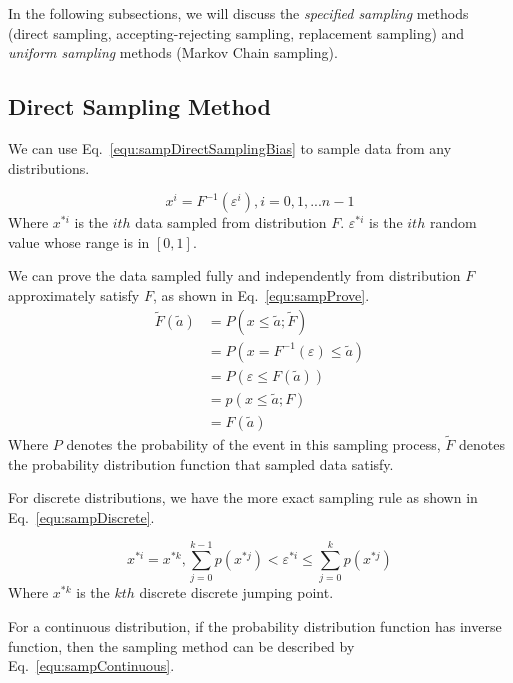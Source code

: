 \documentclass[runningheads,openany]{xhlPaper}
\begin{document}
In the following subsections, we will discuss the \emph{specified sampling} methods (direct sampling, accepting-rejecting sampling, replacement sampling) and \emph{uniform sampling} methods (Markov Chain sampling).

\subsection{Direct Sampling Method}
We can use Eq.~\ref{equ:sampDirectSamplingBias} to sample data from any distributions.

\begin{equation}
\label{equ:sampDirectSamplingBias}
{x^i} = {F^{ - 1}}\left( {{\varepsilon ^i}} \right),i = 0,1,...n - 1
\end{equation}
Where $x^{*i}$ is the $ith$ data sampled from distribution $F$. $\varepsilon ^{*i}$ is the $ith$ random value whose range is in $\left[0, 1\right]$.

We can prove the data sampled fully and independently from distribution $F$ approximately satisfy $F$, as shown in Eq.~\ref{equ:sampProve}.
\begin{equation}
\label{equ:sampProve}
\begin{aligned}
\tilde F\left( {\tilde a} \right) &= P\left( {x \le \tilde a; \tilde{F}} \right)\\
 &= P\left( {x = {F^{ - 1}}\left( \varepsilon  \right) \le \tilde a} \right)\\
 &= P\left( {\varepsilon  \le F\left( {\tilde a} \right)} \right)\\
 &= p\left( {x \le \tilde a; F} \right)\\
 &= F\left( {\tilde a} \right)
\end{aligned}
\end{equation}
Where $P$ denotes the probability of the event in this sampling process, $\tilde{F}$ denotes the probability distribution function that sampled data satisfy.

For discrete distributions, we have the more exact sampling rule as shown in Eq.~\ref{equ:sampDiscrete}.

\begin{equation}
\label{equ:sampDiscrete}
{x^{*i}} = {x^{*k}},\sum\limits_{j = 0}^{k - 1} {p\left( {{x^{*j}}} \right)}  < {\varepsilon ^{*i}} \le \sum\limits_{j = 0}^k {p\left( {{x^{*j}}} \right)}
\end{equation} 
Where $x^{*k}$ is the $kth$ discrete discrete jumping point.

For a continuous distribution, if the probability distribution function has inverse function, then the sampling method can be described by Eq.~\ref{equ:sampContinuous}.
\end{document}
